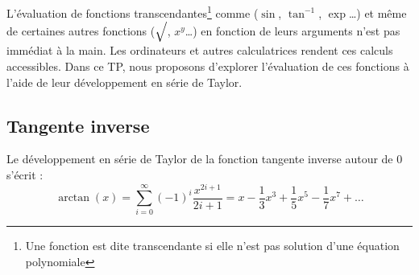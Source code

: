 
L'évaluation  de  fonctions transcendantes\footnote{Une  fonction  est
  dite  transcendante  si  elle  n'est  pas  solution  d'une  équation
  polynomiale} comme ($\sin $, $\tan^{-1}$,  $\exp $\ldots) et même de
certaines autres fonctions  ($\sqrt{\strut}$, $x^y$\ldots) en fonction
de leurs  arguments n'est pas immédiat  à la main. Les  ordinateurs et
autres calculatrices rendent ces calculs accessibles. Dans ce TP, nous
proposons d'explorer  l'évaluation de ces  fonctions à l'aide  de leur
développement en série de Taylor.



\subsection{Tangente inverse}

Le développement en série de Taylor de la fonction tangente inverse autour de 0 
s'écrit : 
\begin{equation}
\arctan(x) = \sum_{i=0}^\infty (-1)^i\frac{x^{2i+1}}{2i+1}
=x -\frac{1}{3}x^3 + \frac{1}{5}x^5-\frac{1}{7}x^7+\ldots
\end{equation}

